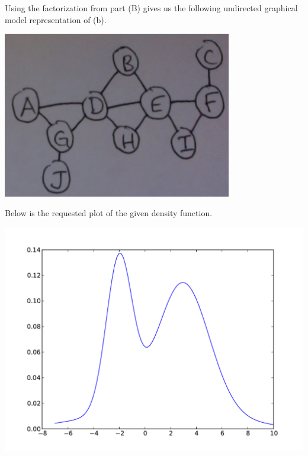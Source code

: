 \documentclass[solution, letterpaper]{cs121}
\begin{document}
\begin{empfile}
Using the factorization from part (B) gives us the following undirected graphical model representation of (b).
\begin{center}
\includegraphics[width=100mm]{undirected_graph_b.png}
\end{center}

\subproblem %
Below is the requested plot of the given density function.
\begin{center}
\includegraphics[scale=0.8]{mixture-o-gaussians.pdf}
\end{center}

\pagebreak


\end{empfile}
\end{document}
